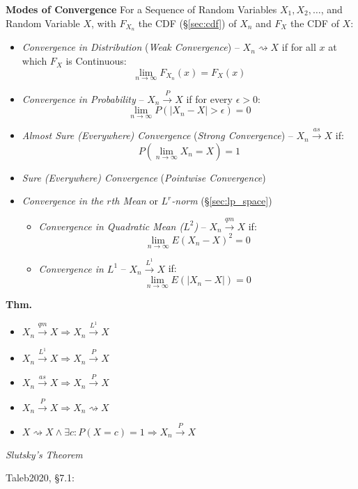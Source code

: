 \textbf{Modes of Convergence}
For a Sequence of Random Variables $X_1, X_2, \ldots$, and Random Variable $X$,
with $F_{X_n}$ the CDF (\S\ref{sec:cdf}) of $X_n$ and $F_X$ the CDF of $X$:
\begin{itemize}
  \item \emph{Convergence in Distribution} (\emph{Weak Convergence}) --
    $X_n \rightsquigarrow X$ if for all $x$ at which $F_X$ is Continuous:
    \[
      \lim_{n\to\infty} F_{X_n}(x) = F_X(x)
    \]
  \item \emph{Convergence in Probability} -- $X_n \xrightarrow{P} X$ if for
    every $\epsilon > 0$:
    \[
      \lim_{n\to\infty}P(|X_n - X| > \epsilon) = 0
    \]
  \item \emph{Almost Sure (Everywhere) Convergence} (\emph{Strong Convergence})
    -- $X_n \xrightarrow{as} X$ if:
    \[
      P(\lim_{n\to\infty}X_n = X) = 1
    \]
  \item \emph{Sure (Everywhere) Convergence} (\emph{Pointwise Convergence})
  \item \emph{Convergence in the $r$th Mean} or \emph{$L^r$-norm}
    (\S\ref{sec:lp_space})
    \begin{itemize}
      \item \emph{Convergence in Quadratic Mean ($L^2$)} --
        $X_n \xrightarrow{qm} X$ if:
        \[
          \lim_{n\to\infty} E(X_n - X)^2 = 0
        \]
      \item \emph{Convergence in $L^1$} -- $X_n \xrightarrow{L^1} X$ if:
        \[
          \lim_{n\to\infty} E(|X_n - X|) = 0
        \]
    \end{itemize}
\end{itemize}

\textbf{Thm.}
\begin{itemize}
  \item $X_n \xrightarrow{qm} X \Rightarrow X_n \xrightarrow{L^1} X$
  \item $X_n \xrightarrow{L^1} X \Rightarrow X_n \xrightarrow{P} X$
  \item $X_n \xrightarrow{as} X \Rightarrow X_n \xrightarrow{P} X$
  \item $X_n \xrightarrow{P} X \Rightarrow X_n \rightsquigarrow X$
  \item $X \rightsquigarrow X \wedge \exists c : P(X = c) = 1 \Rightarrow
    X_n \xrightarrow{P} X$
\end{itemize}

\emph{Slutsky's Theorem}

Taleb2020, \S 7.1:

